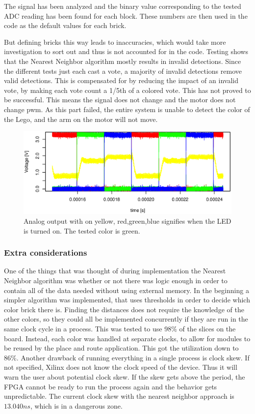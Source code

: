 The signal has been analyzed and the binary value corresponding to the tested ADC reading has been found for each block.
These numbers are then used in the code as the default values for each brick.

But defining bricks this way leads to inaccuracies, which would take more investigation to sort out and thus is not accounted for in the code.
Testing shows that the Nearest Neighbor algorithm mostly results in invalid detections.
Since the different tests just each cast a vote, a majority of invalid detections remove valid detections.
This is compensated for by reducing the impact of an invalid vote, by making each vote count a 1/5th of a colored vote.
This has not proved to be successful.
This means the signal does not change and the motor does not change pwm.
As this part failed, the entire system is unable to detect the color of the Lego, and the arm on the motor will not move. 

\begin{figure}[h]
\centering
 \includegraphics[width=0.9\linewidth]{img/analog_values}
 \caption[Analog output with all diodes.]{Analog output with on yellow, red,green,blue signifies when the LED is turned on. The tested color is green.}
 \label{fig:analog_values}
\end{figure}

\subsubsection{Extra considerations}
One of the things that was thought of during implementation the Nearest Neighbor algorithm was whether or not there was logic enough in order to contain all of the data needed without using external memory. In the beginning a simpler algorithm was implemented, that uses thresholds in order to decide which color brick there is.
Finding the distances does not require the knowledge of the other colors, so they could all be implemented concurrently if they are run in the same clock cycle in a process.
This was tested to use 98\% of the slices on the board.
Instead, each color was handled at separate clocks, to allow for modules to be reused by the place and route application.
This got the utilization down to 86\%.
Another drawback of running everything in a single process is clock skew.
If not specified, Xilinx does not know the clock speed of the device.
Thus it will warn the user about potential clock skew.
If the skew gets above the period, the FPGA cannot be ready to run the process again and the behavior gets unpredictable.
The current clock skew with the nearest neighbor approach is $13.040 ns$, which is in a dangerous zone. 

